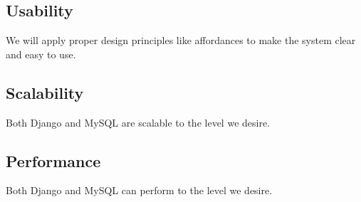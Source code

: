 \documentclass[a4paper]{article}
\begin{document}
\subsection{Usability}

We will apply proper design principles like affordances to make the system clear and easy to use.

\subsection{Scalability}

Both Django and MySQL are scalable to the level we desire.
        
\subsection{Performance}

Both Django and MySQL can perform to the level we desire.
\end{document}
